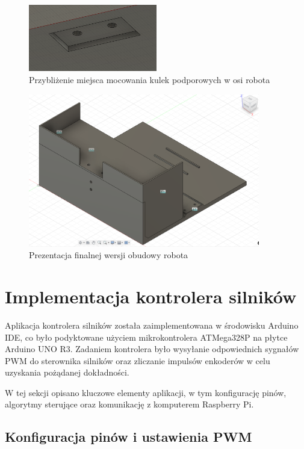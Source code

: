 \begin{figure}[H]
  \centering
  \includegraphics[width=0.5\textwidth]{./graf/ball-close.png}
  \caption{Przybliżenie miejsca mocowania kulek podporowych w osi robota}
  \label{fig:ball-close}
\end{figure}

\begin{figure}[H]
  \centering
  \includegraphics[width=0.9\textwidth]{./graf/full.png}
  \caption{Prezentacja finalnej wersji obudowy robota}
  \label{fig:full}
\end{figure}
 
\clearpage

\section{Implementacja kontrolera silników}

Aplikacja kontrolera silników została zaimplementowana w środowisku Arduino IDE, co było podyktowane użyciem mikrokontrolera ATMega328P na płytce Arduino UNO R3. Zadaniem kontrolera było wysyłanie odpowiednich sygnałów PWM do sterownika silników oraz zliczanie impulsów enkoderów w celu uzyskania pożądanej dokładności. 

W tej sekcji opisano kluczowe elementy aplikacji, w tym konfigurację pinów, algorytmy sterujące oraz komunikację z komputerem Raspberry Pi.

\subsection{Konfiguracja pinów i ustawienia PWM}

